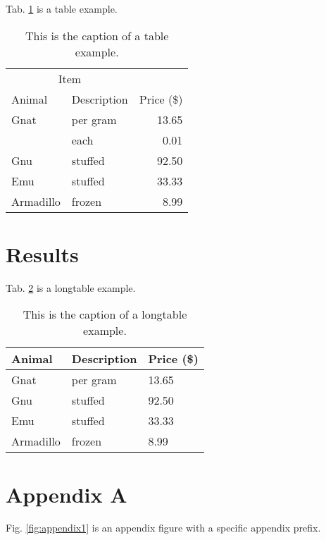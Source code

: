 \documentclass[11pt]{article} %
\begin{document}
Tab. \ref{tab:table} is a table example.

\begin{table}[H]
\centering
\caption{This is the caption of a table example.}
\label{tab:table}
\begin{tabular}{llr}
\toprule
\multicolumn{2}{c}{Item}\\
\cmidrule(r){1-2}
Animal & Description & Price (\$)\\
\midrule
Gnat & per gram & 13.65\\
& each & 0.01\\
Gnu & stuffed & 92.50\\
Emu & stuffed & 33.33\\
Armadillo & frozen & 8.99\\
\bottomrule
\end{tabular}
\end{table}

\section{Results}

Tab. \ref{tab:longtable_default} is a longtable example.

\begin{longtable}{lll}
\caption{This is the caption of a longtable example.}\label{tab:longtable_default}\\
\toprule
Animal & Description & Price (\$)\\
\midrule
Gnat & per gram & 13.65\\
Gnu & stuffed & 92.50\\
Emu & stuffed & 33.33\\
Armadillo & frozen & 8.99\\
\bottomrule
\end{longtable}



\section*{Appendix A}
\renewcommand\thefigure{A\arabic{figure}}
\setcounter{figure}{0}
\renewcommand{\thetable}{A\arabic{table}}
\setcounter{table}{0}

Fig. \ref{fig:appendix1} is an appendix figure with a specific appendix prefix.
\end{document}
